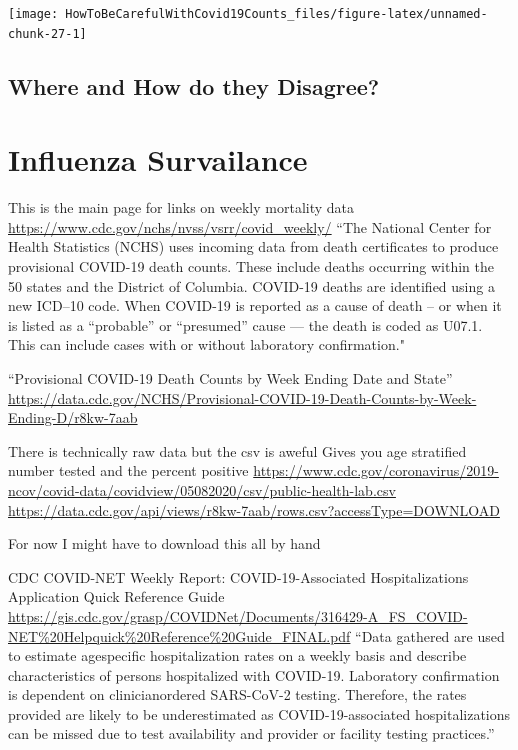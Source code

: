 \documentclass[
]{book}
\begin{document}
\begin{center}\texttt{[image: HowToBeCarefulWithCovid19Counts\_files/figure-latex/unnamed-chunk-27-1]} \end{center}

\hypertarget{where-and-how-do-they-disagree}{%
\subsection{Where and How do they Disagree?}\label{where-and-how-do-they-disagree}}

\hypertarget{influenza-survailance}{%
\section{Influenza Survailance}\label{influenza-survailance}}

This is the main page for links on weekly mortality data
\url{https://www.cdc.gov/nchs/nvss/vsrr/covid_weekly/}
``The National Center for Health Statistics (NCHS) uses incoming data from death certificates to produce provisional COVID-19 death counts. These include deaths occurring within the 50 states and the District of Columbia. COVID-19 deaths are identified using a new ICD--10 code. When COVID-19 is reported as a cause of death -- or when it is listed as a ``probable'' or ``presumed'' cause --- the death is coded as U07.1. This can include cases with or without laboratory confirmation."

``Provisional COVID-19 Death Counts by Week Ending Date and State''
\url{https://data.cdc.gov/NCHS/Provisional-COVID-19-Death-Counts-by-Week-Ending-D/r8kw-7aab}

There is technically raw data but the csv is aweful
Gives you age stratified number tested and the percent positive
\url{https://www.cdc.gov/coronavirus/2019-ncov/covid-data/covidview/05082020/csv/public-health-lab.csv}
\url{https://data.cdc.gov/api/views/r8kw-7aab/rows.csv?accessType=DOWNLOAD}

For now I might have to download this all by hand

CDC COVID-NET Weekly Report: COVID-19-Associated
Hospitalizations Application Quick Reference Guide
\url{https://gis.cdc.gov/grasp/COVIDNet/Documents/316429-A_FS_COVID-NET\%20Helpquick\%20Reference\%20Guide_FINAL.pdf}
``Data gathered are used to estimate agespecific hospitalization rates on a weekly basis and describe characteristics of persons hospitalized with COVID-19. Laboratory confirmation is dependent on clinicianordered SARS-CoV-2 testing. Therefore, the rates provided are likely to be underestimated as COVID-19-associated hospitalizations can be missed due to test availability and provider or facility testing practices.''
\end{document}
